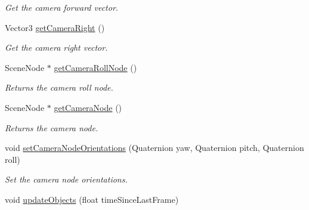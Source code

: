 \begin{DoxyCompactItemize}
\begin{DoxyCompactList}\small\item\em \-Get the camera forward vector. \end{DoxyCompactList}\item 
\hypertarget{classGame_a0b37f9080176730bb820c51bf8c3ec74}{
\-Vector3 \hyperlink{classGame_a0b37f9080176730bb820c51bf8c3ec74}{get\-Camera\-Right} ()}
\label{d9/d68/classGame_a0b37f9080176730bb820c51bf8c3ec74}

\begin{DoxyCompactList}\small\item\em \-Get the camera right vector. \end{DoxyCompactList}\item 
\hypertarget{classGame_a055823b3127f1952b4e475b20010eba7}{
\-Scene\-Node $\ast$ \hyperlink{classGame_a055823b3127f1952b4e475b20010eba7}{get\-Camera\-Roll\-Node} ()}
\label{d9/d68/classGame_a055823b3127f1952b4e475b20010eba7}

\begin{DoxyCompactList}\small\item\em \-Returns the camera roll node. \end{DoxyCompactList}\item 
\hypertarget{classGame_a7dc8ebba62bb73dbcb80198fd4dca0c0}{
\-Scene\-Node $\ast$ \hyperlink{classGame_a7dc8ebba62bb73dbcb80198fd4dca0c0}{get\-Camera\-Node} ()}
\label{d9/d68/classGame_a7dc8ebba62bb73dbcb80198fd4dca0c0}

\begin{DoxyCompactList}\small\item\em \-Returns the camera node. \end{DoxyCompactList}\item 
\hypertarget{classGame_a5f10f1378a6850e9d51f94094dedb253}{
void \hyperlink{classGame_a5f10f1378a6850e9d51f94094dedb253}{set\-Camera\-Node\-Orientations} (\-Quaternion yaw, \-Quaternion pitch, \-Quaternion roll)}
\label{d9/d68/classGame_a5f10f1378a6850e9d51f94094dedb253}

\begin{DoxyCompactList}\small\item\em \-Set the camera node orientations. \end{DoxyCompactList}\item 
\hypertarget{classGame_a7c44532e925fdd8d2b05bc6db1774b1a}{
void \hyperlink{classGame_a7c44532e925fdd8d2b05bc6db1774b1a}{update\-Objects} (float time\-Since\-Last\-Frame)}
\label{d9/d68/classGame_a7c44532e925fdd8d2b05bc6db1774b1a}


\end{DoxyCompactItemize}
